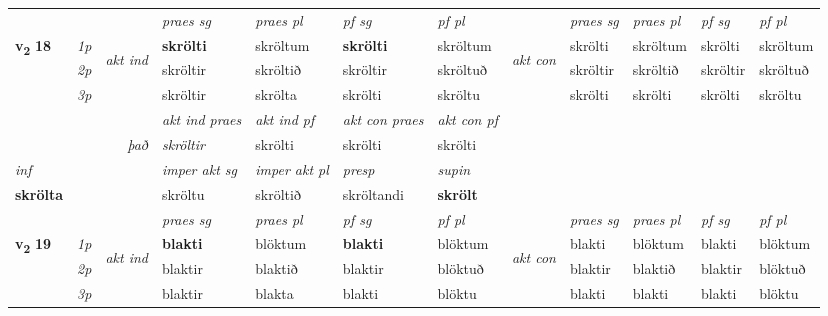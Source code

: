 \begin{longtable}[l]{X>{\footnotesize\itshape}llXXXXlXXXX}
\midrule

 & &   & \textit{praes sg}  & \textit{praes pl}    & \textit{ pf sg} & \textit{pf pl} & & \textit{praes sg}  & \textit{praes pl}    & \textit{pf sg} & \textit{pf pl }  \\ \cmidrule{4-7} \cmidrule{9-12}
 \multirow{2}{*}{{{\textbf{v{\textsubscript{2}}} \Large{\textbf{18}}}}}  & 1p & \multirow{3}{*}{\begin{turn}{90}\textit{akt ind}\end{turn}} & \textbf{skrölti} & skröltum & \textbf{skrölti} & skröltum & \multirow{3}{*}{\begin{turn}{90}\textit{akt con}\end{turn}} &skrölti & skröltum & skrölti & skröltum\\*
 & 2p &  &  skröltir  & skröltið & skröltir & skröltuð & & skröltir & skröltið & skröltir & skröltuð \\*
 & 3p &  & skröltir & skrölta & skrölti & skröltu & & skrölti & skrölti& skrölti & skröltu \\*
\cmidrule{4-7} \cmidrule{9-12}

   && &  \textit{akt ind praes} & \textit{akt ind pf} & \textit{akt con praes} & \textit{akt con pf} \\*
\multicolumn{3}{r}{\textit{það}} & skröltir & skrölti & skrölti & skrölti \\*

\cmidrule{4-7}
   {\textit{inf}} & &  & \textit{imper akt sg} & \textit{imper akt pl}   & \textit{presp} & \textit{supin}   \\*
  {\textbf{skrölta}} & && skröltu  & skröltið   & skröltandi &  \textbf{skrölt}   \\*

\midrule

 & &   & \textit{praes sg}  & \textit{praes pl}    & \textit{ pf sg} & \textit{pf pl} & & \textit{praes sg}  & \textit{praes pl}    & \textit{pf sg} & \textit{pf pl }  \\ \cmidrule{4-7} \cmidrule{9-12}
 \multirow{2}{*}{{{\textbf{v{\textsubscript{2}}} \Large{\textbf{19}}}}}  & 1p & \multirow{3}{*}{\begin{turn}{90}\textit{akt ind}\end{turn}} & \textbf{blakti} & blöktum & \textbf{blakti} & blöktum & \multirow{3}{*}{\begin{turn}{90}\textit{akt con}\end{turn}} &blakti & blöktum & blakti & blöktum\\*
 & 2p &  &  blaktir  & blaktið & blaktir & blöktuð & & blaktir & blaktið & blaktir & blöktuð \\*
 & 3p &  & blaktir & blakta & blakti & blöktu & & blakti & blakti& blakti & blöktu \\*
\cmidrule{4-7} \cmidrule{9-12}


\end{longtable}
